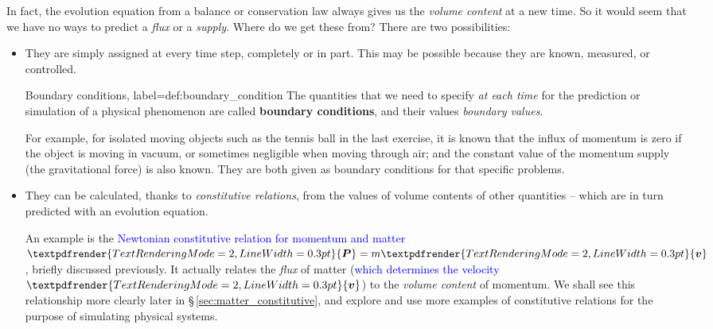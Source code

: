 \documentclass[a4paper,12pt,%
onecolumn,oneside,titlepage,%
british%
]{memoir}
\renewcommand*{\bm}[1]{\textpdfrender{TextRenderingMode=2,LineWidth=0.3pt}{\boldsymbol{#1}}}
\renewcommand*{\|}[1][]{\nonscript\:#1\vert\nonscript\:\mathopen{}}
\newcommand*{\sect}{\S}%
\renewcommand*{\autoref}[2]{\sidepar{\vspace{-1ex}\footnotesize{\color{blue}\faIcon{%
angle-right%
}\enspace\sect\,\ref{#1} page\,\pageref{#1}}}\textcolor{blue}{#2}}
\newcommand*{\yv}{\bm{v}}
\newcommand*{\yM}{m}%
\newcommand*{\yP}{\bm{P}}
\begin{document}
In fact, the evolution equation from a balance or conservation law always gives us the \emph{volume content} at a new time. So it would seem that we have no ways to predict a \emph{flux} or a \emph{supply}. Where do we get these from? There are two possibilities:
\begin{itemize}[para]
\item They are simply assigned at every time step, completely or in part. This may be possible because they are known, measured, or controlled.
  \begin{definition}{Boundary conditions, label={def:boundary_condition}}
    The quantities that we need to specify \emph{at each time} for the prediction or simulation of a physical phenomenon are called \textbf{boundary conditions}, and their values \emph{boundary values}.
  \end{definition}

  For example, for isolated moving objects such as the tennis ball in the last exercise, it is known that the influx of momentum is zero if the object is moving in vacuum, or sometimes negligible when moving through air; and the constant value of the momentum supply (the gravitational force) is also known. They are both given as boundary conditions for that specific problems.

\item They can be calculated, thanks to \emph{constitutive relations}, from the values of volume contents of other quantities -- which are in turn predicted with an evolution equation.

  An example is the \autoref{item:momentum_mass_velocity}{Newtonian constitutive relation for momentum and matter} $\yP = \yM\yv$, briefly discussed previously. It actually relates the \emph{flux} of matter (\autoref{sec:fluxes_velocities}{which determines the velocity $\yv$}) to the \emph{volume content} of momentum. We shall see this relationship more clearly later in \sect\,\ref{sec:matter_constitutive}, and explore and use more examples of constitutive relations for the purpose of simulating physical systems.
\end{itemize}
\end{document}
